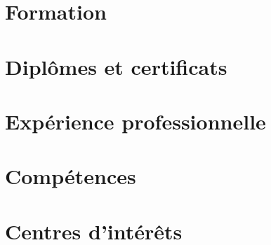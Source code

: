 




\begin{sloppypar}
\begin{paracol}{2}





\section{Formation}




\section{Dipl\^omes et certificats}




\section{Exp\'erience professionnelle}




\section{Comp\'etences}




\section{Centres d'int\'er\^ets}


\end{paracol}
\end{sloppypar}
